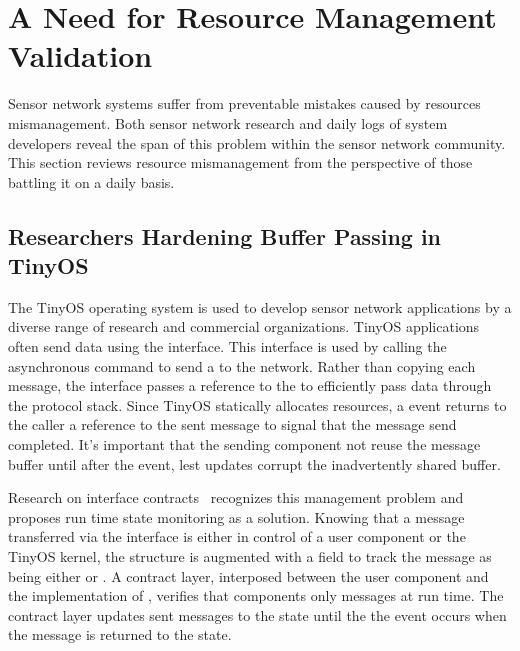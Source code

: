 \section{A Need for Resource Management Validation}
\label{sec:mot}

Sensor network systems suffer from preventable mistakes caused by resources
mismanagement.
%
Both sensor network research and daily logs of system developers reveal the
span of this problem within the sensor network community.
%
This section reviews resource mismanagement from the perspective of those
battling it on a daily basis.



\subsection{Researchers Hardening Buffer Passing in TinyOS}
\label{ssec:tinyos}


The TinyOS operating system is used to develop sensor network applications by
a diverse range of research and commercial organizations.
%
TinyOS applications often send data using the  interface.
%
This interface is used by calling the asynchronous  command to
send a  to the network.
%
Rather than copying each message, the  interface passes a
reference to the  to efficiently pass data through the protocol
stack.
%
Since TinyOS statically allocates resources, a  event returns to
the caller a reference to the sent message to signal that the message send
completed.
%
It's important that the sending component not reuse the message buffer until
after the  event, lest updates corrupt the inadvertently shared
buffer.



Research on interface contracts~\cite{archer07interface} recognizes this
management problem and proposes run time state monitoring as a solution.
%
Knowing that a message transferred via the  interface is either in
control of a user component or the TinyOS kernel, the 
structure is augmented with a  field to track the message
as being either  or .
%
A contract layer, interposed between the user component and the implementation
of , verifies that components only   
messages at run time.
%
The contract layer updates sent messages to the  state until
the the  event occurs when the message is returned to the
 state.



